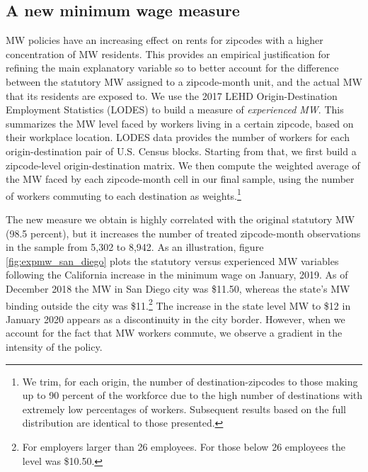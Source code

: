 \subsection{A new minimum wage measure}
MW policies have an increasing effect on rents for zipcodes with a higher concentration of MW residents. 
This provides an empirical justification for refining the main explanatory variable so to better account for 
the difference between the statutory MW assigned to a zipcode-month unit, and the actual MW that its 
residents are exposed to. We use the 2017 LEHD Origin-Destination Employment Statistics (LODES) to 
build a measure of \textit{experienced MW}. This summarizes the MW level faced by workers living in a certain zipcode, 
based on their workplace location. LODES data provides the number of workers for each origin-destination 
pair of U.S. Census blocks. Starting from that, we first build a zipcode-level origin-destination matrix. 
We then compute the weighted average of the MW faced by each zipcode-month cell in our final sample, 
using the number of workers commuting to each destination as weights.\footnote{We trim, for each 
	origin, the number of destination-zipcodes to those making up to 90 percent of the workforce due to 
	the high number of destinations with extremely low percentages of workers. Subsequent results 
	based on the full distribution are identical to those presented.} 

The new measure we obtain is highly correlated with the original statutory MW (98.5 percent), but it 
increases the number of treated zipcode-month observations in the sample from 5,302 to 8,942. 
As an illustration, figure \ref{fig:expmw_san_diego} plots the statutory versus experienced 
MW variables following the California increase in the minimum wage on January, 2019. As of 
December 2018 the MW in San Diego city was \$11.50, whereas the state's MW binding outside 
the city was \$11.\footnote{For employers larger than 26 employees. For those below 26 
	employees the level was \$10.50.}
The increase in the state level MW to \$12 in January 2020 appears as a discontinuity in the 
city border. However, when we account for the fact that MW workers commute, we observe a 
gradient in the intensity of the policy.


